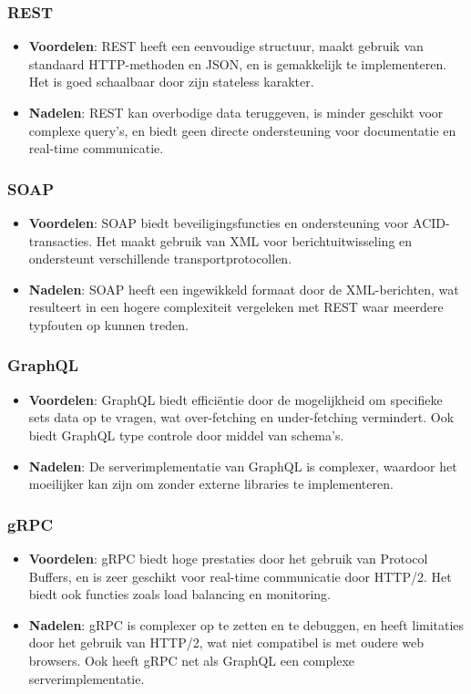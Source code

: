 \subsubsection{REST}
\begin{itemize}
    \item \textbf{Voordelen}: REST heeft een eenvoudige structuur, maakt gebruik van standaard HTTP-methoden en JSON, en is gemakkelijk te implementeren. Het is goed schaalbaar door zijn stateless karakter.
    \item \textbf{Nadelen}: REST kan overbodige data teruggeven, is minder geschikt voor complexe query’s, en biedt geen directe ondersteuning voor documentatie en real-time communicatie.
\end{itemize}

\subsubsection{SOAP}
\begin{itemize}
    \item \textbf{Voordelen}: SOAP biedt beveiligingsfuncties en ondersteuning
    voor ACID-transacties. Het maakt gebruik van XML voor berichtuitwisseling en
    ondersteunt verschillende transportprotocollen.
    \item \textbf{Nadelen}: SOAP heeft een ingewikkeld formaat door de
    XML-berichten, wat resulteert in een hogere complexiteit vergeleken met REST
    waar meerdere typfouten op kunnen treden.
\end{itemize}

\subsubsection{GraphQL}
\begin{itemize}
    \item \textbf{Voordelen}: GraphQL biedt efficiëntie door de mogelijkheid om
    specifieke sets data op te vragen, wat over-fetching en under-fetching
    vermindert. Ook biedt GraphQL type controle door middel van schema's.
    \item \textbf{Nadelen}: De serverimplementatie van GraphQL is complexer,
    waardoor het moeilijker kan zijn om zonder externe libraries te implementeren.
\end{itemize}

\subsubsection{gRPC}
\begin{itemize}
    \item \textbf{Voordelen}: gRPC biedt hoge prestaties door het gebruik van
    Protocol Buffers, en is zeer geschikt voor real-time communicatie door
    HTTP/2. Het biedt ook functies zoals load balancing en monitoring.
    \item \textbf{Nadelen}: gRPC is complexer op te zetten en te debuggen, en
    heeft limitaties door het gebruik van HTTP/2, wat niet compatibel is met
    oudere web browsers. Ook heeft gRPC net als GraphQL een complexe serverimplementatie.
\end{itemize}

